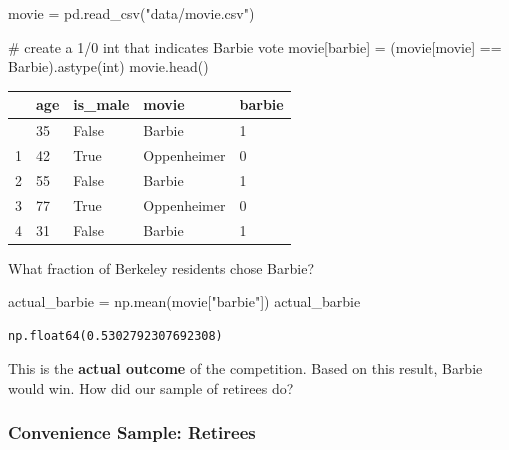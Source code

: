 \documentclass[
  letterpaper,
  DIV=11,
  numbers=noendperiod]{scrreprt}
\newenvironment{Shaded}{\begin{snugshade}}{\end{snugshade}}
\newcommand{\BuiltInTok}[1]{\textcolor[rgb]{0.00,0.23,0.31}{#1}}
\newcommand{\CommentTok}[1]{\textcolor[rgb]{0.37,0.37,0.37}{#1}}
\newcommand{\NormalTok}[1]{\textcolor[rgb]{0.00,0.23,0.31}{#1}}
\newcommand{\OperatorTok}[1]{\textcolor[rgb]{0.37,0.37,0.37}{#1}}
\newcommand{\StringTok}[1]{\textcolor[rgb]{0.13,0.47,0.30}{#1}}
\begin{document}
\begin{Shaded}
\begin{Highlighting}[]
\NormalTok{movie }\OperatorTok{=}\NormalTok{ pd.read\_csv(}\StringTok{"data/movie.csv"}\NormalTok{)}

\CommentTok{\# create a 1/0 int that indicates Barbie vote}
\NormalTok{movie[}\StringTok{\textquotesingle{}barbie\textquotesingle{}}\NormalTok{] }\OperatorTok{=}\NormalTok{ (movie[}\StringTok{\textquotesingle{}movie\textquotesingle{}}\NormalTok{] }\OperatorTok{==} \StringTok{\textquotesingle{}Barbie\textquotesingle{}}\NormalTok{).astype(}\BuiltInTok{int}\NormalTok{)}
\NormalTok{movie.head()}
\end{Highlighting}
\end{Shaded}

\begin{longtable}[]{@{}lllll@{}}
\toprule\noalign{}
& age & is\_male & movie & barbie \\
\midrule\noalign{}
\endhead
\bottomrule\noalign{}
\endlastfoot
0 & 35 & False & Barbie & 1 \\
1 & 42 & True & Oppenheimer & 0 \\
2 & 55 & False & Barbie & 1 \\
3 & 77 & True & Oppenheimer & 0 \\
4 & 31 & False & Barbie & 1 \\
\end{longtable}

What fraction of Berkeley residents chose Barbie?

\begin{Shaded}
\begin{Highlighting}[]
\NormalTok{actual\_barbie }\OperatorTok{=}\NormalTok{ np.mean(movie[}\StringTok{"barbie"}\NormalTok{])}
\NormalTok{actual\_barbie}
\end{Highlighting}
\end{Shaded}

\begin{verbatim}
np.float64(0.5302792307692308)
\end{verbatim}

This is the \textbf{actual outcome} of the competition. Based on this
result, Barbie would win. How did our sample of retirees do?

\subsubsection{Convenience Sample:
Retirees}\label{convenience-sample-retirees}
\end{document}
